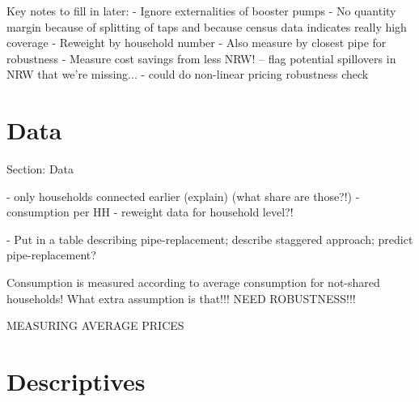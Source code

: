 \documentclass[12pt,table]{article}
\begin{document}
Key notes to fill in later:
- Ignore externalities of booster pumps
- No quantity margin because of splitting of taps and because census data indicates really high coverage
- Reweight by household number
- Also measure by closest pipe for robustness
- Measure cost savings from less NRW! 
	-- flag potential spillovers in NRW that we're missing...
- could do non-linear pricing robustness check




\section{Data}

Section: Data

	- only households connected earlier (explain) (what share are those?!)
	- consumption per HH
	- reweight data for household level?!

	- Put in a table describing pipe-replacement;  describe staggered approach; predict pipe-replacement?

Consumption is measured according to average consumption for not-shared households!  What extra assumption is that!!!  NEED ROBUSTNESS!!! 

MEASURING AVERAGE PRICES


\section{Descriptives}
\end{document}
